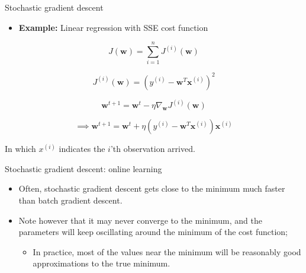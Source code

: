\documentclass[serif, aspectratio=169]{beamer}
\begin{document}
\begin{frame}{Stochastic gradient descent}

    \begin{itemize}
        \item \textbf{Example:} Linear regression with SSE cost function
    \end{itemize}
    \[
    J(\mathbf{w}) = \sum_{i=1}^{n} J^{(i)}(\mathbf{w})
    \]
    
    \[
    J^{(i)}(\mathbf{w}) = \left( y^{(i)} - \mathbf{w}^T \mathbf{x}^{(i)} \right)^2
    \]
    
    \[
    \mathbf{w}^{t+1} = \mathbf{w}^t - \eta \nabla_{\mathbf{w}} J^{(i)}(\mathbf{w})
    \]
    
    \[
    \implies \mathbf{w}^{t+1} = \mathbf{w}^t + \eta \left( y^{(i)} - \mathbf{w}^T \mathbf{x}^{(i)} \right) \mathbf{x}^{(i)}
    \]
    
    \begin{center}
        In which \( x^{(i)} \) indicates the \(i\)'th observation arrived.
    \end{center}
    
\end{frame}



\begin{frame}{Stochastic gradient descent: online learning}

    \begin{itemize}
        \item Often, stochastic gradient descent gets close to the minimum much faster than batch gradient descent.
        \item Note however that it may never converge to the minimum, and the parameters will keep oscillating around the minimum of the cost function;
        \begin{itemize}
            \item In practice, most of the values near the minimum will be reasonably good approximations to the true minimum.
        \end{itemize}
    \end{itemize}

\end{frame}
\end{document}
